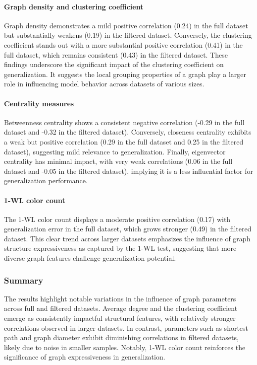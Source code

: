 \paragraph{Graph density and clustering coefficient}
Graph density demonstrates a mild positive correlation (0.24) in the full dataset but substantially weakens (0.19) in the filtered dataset. Conversely, the clustering coefficient stands out with a more substantial positive correlation (0.41) in the full dataset, which remains consistent (0.43) in the filtered dataset. These findings underscore the significant impact of the clustering coefficient on generalization. It suggests the local grouping properties of a graph play a larger role in influencing model behavior across datasets of various sizes.

\paragraph{Centrality measures}
Betweenness centrality shows a consistent negative correlation (-0.29 in the full dataset and -0.32 in the filtered dataset). Conversely, closeness centrality exhibits a weak but positive correlation (0.29 in the full dataset and 0.25 in the filtered dataset), suggesting mild relevance to generalization. Finally, eigenvector centrality has minimal impact, with very weak correlations (0.06 in the full dataset and -0.05 in the filtered dataset), implying it is a less influential factor for generalization performance.

\paragraph{1-WL color count}
The 1-WL color count displays a moderate positive correlation (0.17) with generalization error in the full dataset, which grows stronger (0.49) in the filtered dataset. This clear trend across larger datasets emphasizes the influence of graph structure expressiveness as captured by the 1-WL test, suggesting that more diverse graph features challenge generalization potential.

\subsubsection{Summary}
The results highlight notable variations in the influence of graph parameters across full and filtered datasets. Average degree and the clustering coefficient emerge as consistently impactful structural features, with relatively stronger correlations observed in larger datasets. In contrast, parameters such as shortest path and graph diameter exhibit diminishing correlations in filtered datasets, likely due to noise in smaller samples. Notably, 1-WL color count reinforces the significance of graph expressiveness in generalization.


